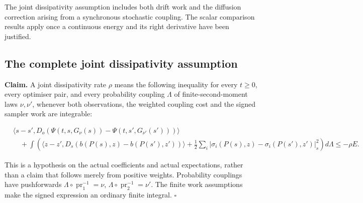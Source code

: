 \documentclass[11pt,a4paper]{report}
\begin{document}
The joint dissipativity assumption includes both drift work and the diffusion correction arising from a synchronous stochastic coupling. The scalar comparison results apply once a continuous energy and its right derivative have been justified.

\subsection{\texorpdfstring{The complete joint dissipativity assumption}{The complete joint dissipativity assumption}}


\textbf{Claim.} A joint dissipativity rate \(\rho\) means the following inequality for every \(t\ge0\), every optimiser pair, and every probability coupling \(\Lambda\) of finite-second-moment laws \(\nu,\nu'\), whenever both observations, the weighted coupling cost and the signed sampler work are integrable:

\[\begin{aligned} &\langle s-s',D_o(\Psi(t,s,G_\nu(s))-\Psi(t,s',G_{\nu'}(s')))\rangle\\&\quad+\int\left(\langle z-z',D_s(b(P(s),z)-b(P(s'),z'))\rangle+\frac12\sum_i|\sigma_i(P(s),z)-\sigma_i(P(s'),z')|_s^2\right)d\Lambda\le-\rho E.\end{aligned}\]

This is a hypothesis on the actual coefficients and actual expectations, rather than a claim that follows merely from positive weights. Probability couplings have pushforwards \(\Lambda\circ\operatorname{pr}_1^{-1}=\nu\), \(\Lambda\circ\operatorname{pr}_2^{-1}=\nu'\). The finite work assumptions make the signed expression an ordinary finite integral. \(\square\)
\end{document}
